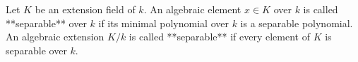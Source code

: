 Let $K$ be an extension field of $k$. An algebraic element $x \in K$ over $k$ is called **separable** over $k$ if its minimal polynomial over $k$ is a separable polynomial. An algebraic extension $K/k$ is called **separable** if every element of $K$ is separable over $k$.
